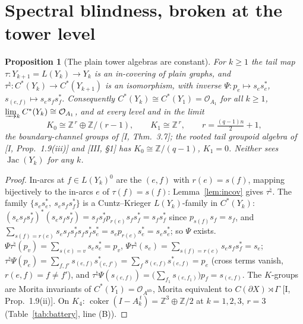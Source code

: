 \documentclass[11pt]{amsart}
\numberwithin{equation}{section}
\newtheorem{proposition}[theorem]{Proposition}
\theoremstyle{definition}
\theoremstyle{remark}
\newcommand{\Z}{\mathbb{Z}}
\newcommand{\cO}{\mathcal{O}}
\newcommand{\Jac}{\operatorname{Jac}}
\newcommand{\coker}{\operatorname{coker}}
\begin{document}
\section{Spectral blindness, broken at the tower level}\label{sec:blind}

\begin{proposition}[The plain tower algebras are constant]\label{prop:plain}
For $k\ge1$ the tail map $\tau\colon Y_{k+1}=L(Y_k)\to Y_k$ is an in-covering of plain
graphs, and $\tau^{\natural}\colon C^*(Y_k)\to C^*(Y_{k+1})$ is an isomorphism, with inverse
$\Psi\colon p_e\mapsto s_es_e^*$, $s_{(e,f)}\mapsto s_es_fs_f^*$. Consequently
$C^*(Y_k)\cong C^*(Y_1)=\cO_{A_1}$ for all $k\ge1$, $\varinjlim_k C^*(Y_k)\cong\cO_{A_1}$,
and at every level and in the limit
\[
K_0\cong\Z^{\,r}\oplus\Z/(r-1),\qquad K_1\cong\Z^{\,r},\qquad r=\tfrac{(q-1)n}{2}+1 ,
\]
the boundary-channel groups of {\rm[I, Thm.~3.7]}; the rooted tail groupoid algebra of
{\rm[I, Prop.~1.9(iii)]} and {\rm[III, \S1]} has $K_0\cong\Z/(q-1)$, $K_1=0$. Neither sees
$\Jac(Y_k)$ for any $k$.
\end{proposition}

\begin{proof}
In-arcs at $f\in L(Y_k)^0$ are the $(e,f)$ with $r(e)=s(f)$, mapping bijectively to the
in-arcs $e$ of $\tau(f)=s(f)$: Lemma~\ref{lem:incov} gives $\tau^\natural$. The family
$\{s_es_e^*,\ s_es_fs_f^*\}$ is a Cuntz--Krieger $L(Y_k)$-family in $C^*(Y_k)$:
$(s_es_fs_f^*)^*(s_es_fs_f^*)=s_fs_f^*p_{r(e)}s_fs_f^*=s_fs_f^*$ since $p_{s(f)}s_f=s_f$,
and $\sum_{s(f)=r(e)}s_es_fs_f^*s_fs_f^*s_e^*=s_ep_{r(e)}s_e^*=s_es_e^*$; so $\Psi$ exists.
$\Psi\tau^\natural(p_v)=\sum_{s(e)=v}s_es_e^*=p_v$,
$\Psi\tau^\natural(s_e)=\sum_{s(f)=r(e)}s_es_fs_f^*=s_e$;
$\tau^\natural\Psi(p_e)=\sum_{f,f'}s_{(e,f)}s_{(e,f')}^*=\sum_fs_{(e,f)}s_{(e,f)}^*=p_e$
(cross terms vanish, $r(e,f)=f\ne f'$), and
$\tau^\natural\Psi(s_{(e,f)})=\bigl(\sum_{f_1}s_{(e,f_1)}\bigr)p_f=s_{(e,f)}$. The
$K$-groups are Morita invariants of $C^*(Y_1)=\cO_{A^{\mathrm{nb}}}$, Morita equivalent to
$C(\partial X)\rtimes\Gamma$ [I, Prop.~1.9(ii)]. On $K_4$: $\coker(I-A_k^{\,t})=\Z^3\oplus\Z/2$
at $k=1,2,3$, $r=3$ (Table~\ref{tab:battery}, line (B)).
\end{proof}
\end{document}

